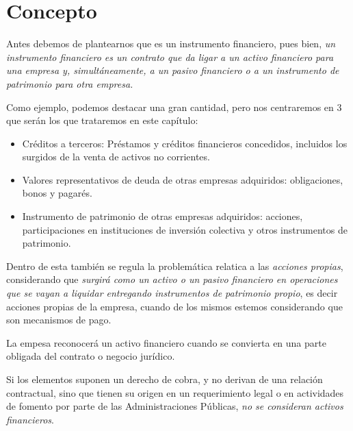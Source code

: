 \section{Concepto}

Antes debemos de plantearnos que es un instrumento financiero, pues bien, \textit{un instrumento financiero es un contrato que da ligar a un activo financiero para una empresa y, simultáneamente, a un pasivo financiero o a un instrumento de patrimonio para otra empresa.}

Como ejemplo, podemos destacar una gran cantidad, pero nos centraremos en 3 que serán los que trataremos en este capítulo:
\begin{itemize}
    \item Créditos a terceros: Préstamos y créditos financieros concedidos, incluidos los surgidos de la venta de activos no corrientes.
    \item Valores representativos de deuda de otras empresas adquiridos: obligaciones, bonos y pagarés.
    \item Instrumento de patrimonio de otras empresas adquiridos: acciones, participaciones en instituciones de inversión colectiva y otros instrumentos de patrimonio.
\end{itemize}


Dentro de esta también se regula la problemática relatica a las \textit{acciones propias}, considerando que \textit{surgirá como un activo o un pasivo financiero en operaciones que se vayan a liquidar entregando instrumentos de patrimonio propio}, es decir acciones propias de la empresa, cuando de los mismos estemos considerando que son mecanismos de pago.

La empesa reconocerá un activo financiero cuando se convierta en una parte obligada del contrato o negocio jurídico.

Si los elementos suponen un derecho de cobra, y no derivan de una relación contractual, sino que tienen su origen en un requerimiento legal o en actividades de fomento por parte de las Administraciones Públicas, \textit{no se consideran activos financieros}.

